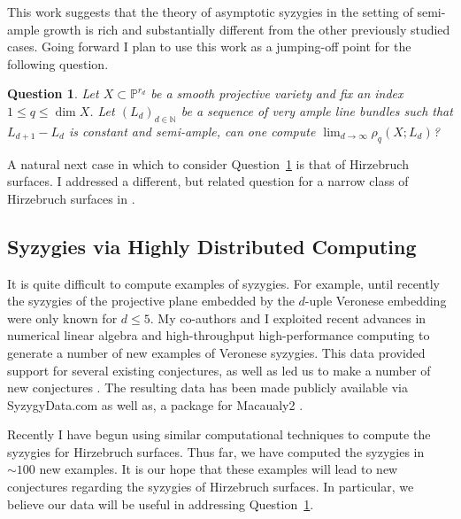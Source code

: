 \documentclass[11pt,reqno]{amsart}
\newtheorem{question}[lemma]{Question}
\theoremstyle{remark}
\newcommand{\N}{\mathbb{N}}
\renewcommand{\P}{\mathbb{P}}
\begin{document}
This work suggests that the theory of asymptotic syzygies in the setting of semi-ample growth is rich and substantially different from the other previously studied cases. Going forward I plan to use this work as a jumping-off point for the following question.  

\begin{question}\label{quest:semi-ample}
Let $X\subset \P^{r_d}$ be a smooth projective variety and fix an index $1\leq q \leq \dim X$. Let $(L_{d})_{d\in\N}$ be a sequence of very ample line bundles such that $L_{d+1}-L_{d}$ is constant and semi-ample, can one compute $\lim_{d\to\infty} \rho_{q}\left(X;L_{d}\right)$?
\end{question}

A natural next case in which to consider Question~\ref{quest:semi-ample} is that of Hirzebruch surfaces. I addressed a different, but related question for a narrow class of Hirzebruch surfaces in \cite{bruce19-hirzebruch}.

\subsection{Syzygies via Highly Distributed Computing}

It is quite difficult to compute examples of syzygies. For example, until recently the syzygies of the projective plane embedded by the $d$-uple Veronese embedding were only known for $d\leq 5$. My co-authors and I exploited recent advances in numerical linear algebra and high-throughput high-performance computing to generate a number of new examples of Veronese syzygies. This data provided support for several existing conjectures, as well as led us to make a number of new conjectures \cite{bruceErmanGoldsteinYang18}. 
The resulting data has been made publicly available via SyzygyData.com as well as, a package for Macaualy2 \cite{bruceErman19, M2}.



Recently I have begun using similar computational techniques to compute the syzygies for Hirzebruch surfaces. Thus far, we have computed the syzygies in  $\sim100$ new examples. It is our hope that these examples will lead to new conjectures regarding the syzygies of Hirzebruch surfaces. In particular, we believe our data will be useful in addressing Question~\ref{quest:semi-ample}.
\end{document}

